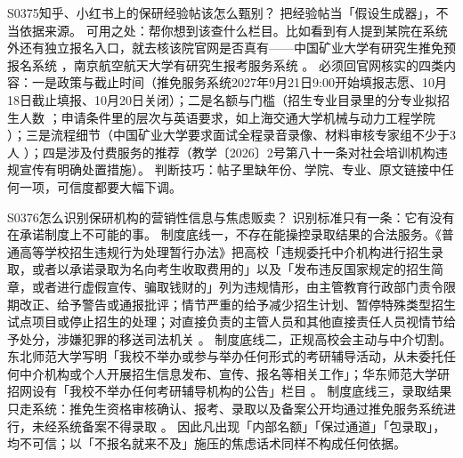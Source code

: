 \begin{qa}{S0375}{知乎、小红书上的保研经验帖该怎么甄别？}
把经验帖当「假设生成器」，不当依据来源。
可用之处：帮你想到该查什么栏目。比如看到有人提到某院在系统外还有独立报名入口，就去核该院官网是否真有——中国矿业大学有研究生推免预报名系统 ，南京航空航天大学有研究生报考服务系统 。
必须回官网核实的四类内容：一是政策与截止时间（推免服务系统2027年9月21日9:00开始填报志愿、10月18日截止填报、10月20日关闭）；二是名额与门槛（招生专业目录里的分专业拟招生人数 ；申请条件里的层次与英语要求，如上海交通大学机械与动力工程学院 ）；三是流程细节（中国矿业大学要求面试全程录音录像、材料审核专家组不少于3人 ）；四是涉及付费服务的推荐（教学〔2026〕2号第八十一条对社会培训机构违规宣传有明确处置措施）。
判断技巧：帖子里缺年份、学院、专业、原文链接中任何一项，可信度都要大幅下调。
\end{qa}

\begin{qa}{S0376}{怎么识别保研机构的营销性信息与焦虑贩卖？}
识别标准只有一条：它有没有在承诺制度上不可能的事。
制度底线一，不存在能操控录取结果的合法服务。《普通高等学校招生违规行为处理暂行办法》把高校「违规委托中介机构进行招生录取，或者以承诺录取为名向考生收取费用的」以及「发布违反国家规定的招生简章，或者进行虚假宣传、骗取钱财的」列为违规情形，由主管教育行政部门责令限期改正、给予警告或通报批评；情节严重的给予减少招生计划、暂停特殊类型招生试点项目或停止招生的处理；对直接负责的主管人员和其他直接责任人员视情节给予处分，涉嫌犯罪的移送司法机关 。
制度底线二，正规高校会主动与中介切割。东北师范大学写明「我校不举办或参与举办任何形式的考研辅导活动，从未委托任何中介机构或个人开展招生信息发布、宣传、报名等相关工作」；华东师范大学研招网设有「我校不举办任何考研辅导机构的公告」栏目 。
制度底线三，录取结果只走系统：推免生资格审核确认、报考、录取以及备案公开均通过推免服务系统进行，未经系统备案不得录取 。
因此凡出现「内部名额」「保过通道」「包录取」，均不可信；以「不报名就来不及」施压的焦虑话术同样不构成任何依据。
\end{qa}

